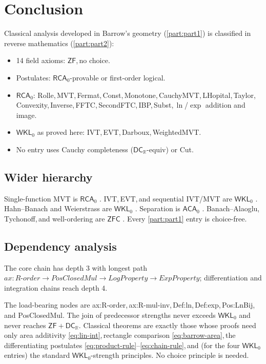\documentclass[11pt,reqno]{amsart}
\providecommand{\R}{\mathbb{R}}
\newcommand{\comma}{,\,\allowbreak}
\theoremstyle{redplain}
\begin{document}
\section{Conclusion}
\label{sec:conclusion}

\noindent Classical analysis developed in Barrow's geometry (\autoref{part:part1}) is classified in reverse mathematics (\autoref{part:part2}):
\begin{itemize}
	\item 14 field axioms: $\textsf{ZF}$\comma no choice.
	\item Postulates: $\textsf{RCA}_0$-provable or first-order logical.
	\item $\textsf{RCA}_0$: Rolle\comma MVT\comma Fermat\comma Const\comma Monotone\comma CauchyMVT\comma LHopital\comma Taylor\comma Convexity\comma Inverse\comma FFTC\comma SecondFTC\comma IBP\comma Subst\comma $\ln$/$\exp$ addition and image.
	\item $\textsf{WKL}_0$ as proved here: IVT\comma EVT\comma Darboux\comma WeightedMVT.
	\item No entry uses Cauchy completeness ($\textsf{DC}_\R$-equiv) or Cut.
\end{itemize}

\subsection{Wider hierarchy}
Single-function MVT is $\textsf{RCA}_0$ \cite{HardinVelleman2001}. 
IVT\comma EVT\comma and sequential IVT/MVT are $\textsf{WKL}_0$ \cite{Simpson2009,Sanders2020}. 
Hahn--Banach and Weierstrass are $\textsf{WKL}_0$ \cite{Simpson2009}. 
Separation is $\textsf{ACA}_0$ \cite{Humphreys2015}. 
Banach--Alaoglu\comma Tychonoff\comma and well-ordering are $\textsf{ZFC}$ \cite{Alaoglu1940,Kelley1950,Jech1973}. 
Every \autoref{part:part1} entry is choice-free.

\subsection{Dependency analysis }
The core chain has depth 3 with longest path $ax{:}R\text{-}order\to PosClosedMul\to LogProperty\to ExpProperty$; differentiation and integration chains reach depth 4. 

The load-bearing nodes are \textsf{ax:R-order}\comma \textsf{ax:R-mul-inv}\comma \textsf{Def:ln}\comma \textsf{Def:exp}\comma \textsf{Pos:LnBij}\comma and \textsf{PosClosedMul}. The join of predecessor strengths never exceeds $\textsf{WKL}_0$ and never reaches $\textsf{ZF}+\textsf{DC}_\R$. Classical theorems are exactly those whose proofs need only area additivity \autoref{eq:lin-int}\comma rectangle comparison \autoref{eq:barrow-area}\comma the differentiating postulates \autoref{eq:product-rule}--\autoref{eq:chain-rule}\comma and (for the four $\textsf{WKL}_0$ entries) the standard $\textsf{WKL}_0$-strength principles. No choice principle is needed.
\end{document}
